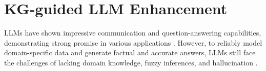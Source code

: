 \newcommand{\gG}{\mathcal{G}\xspace}
\newcommand{\gL}{\mathcal{L}\xspace}
\newcommand{\gZ}{\mathcal{Z}\xspace}

\section{KG-guided LLM Enhancement}
LLMs have shown impressive communication and question-answering capabilities, demonstrating strong promise in various applications \cite{wang2024survey, wu2023bloomberggpt, cui2023chatlaw, chen2023genept, singhal2023large, singhal2023towards, haupt2023ai, nori2023capabilities, lee2023benefits, fleming2023assessing, chen2023meditron, yang2022large, luo2022biogpt, agrawal2022large, mehandru2024evaluating, zhang2023biomedgpt, biswas2023role, dash2023evaluation}. 
However, to reliably model domain-specific data and generate factual and accurate answers, LLMs still face the challenges of lacking domain knowledge, fuzzy inferences, and hallucination \cite{hu2023large, mousavi2024your, yadkori2024believe, asai2024selfrag,yu2024rankrag, liu2023evaluating, zhu2023dyval, zhuo2024roles, yuan2024back, wang2023boosting, ji2023survey, bai2024hallucination, tonmoy2024comprehensive, maynez2020faithfulness, xiao2021hallucination, farquhar2024detecting, ji2023towards, chen2024inside}.

